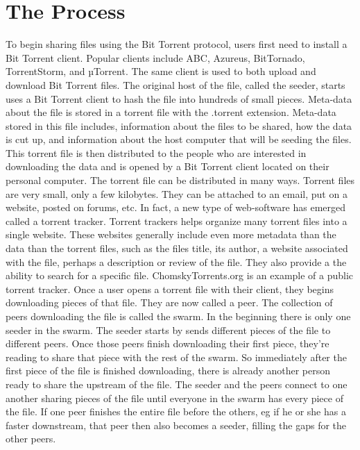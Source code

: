 \documentclass[a4paper,12pt]{report}
\begin{document}
\section{The Process}
To begin sharing files using the Bit Torrent protocol, users first need to install a Bit Torrent client. Popular clients include ABC, Azureus, BitTornado, TorrentStorm, and µTorrent. The same client is used to both upload and download Bit Torrent files.
The original host of the file, called the seeder, starts uses a Bit Torrent client to hash the file into hundreds of small pieces. Meta-data about the file is stored in a torrent file with the .torrent extension. Meta-data stored in this file includes, information about the files to be shared, how the data is cut up, and information about the host computer that will be seeding the files. This torrent file is then distributed to the people who are interested in downloading the data and is opened by a Bit Torrent client located on their personal computer. 
The torrent file can be distributed in many ways. Torrent files are very small, only a few kilobytes. They can be attached to an email, put on a website, posted on forums, etc. In fact, a new type of web-software has emerged called a torrent tracker. Torrent trackers helps organize many torrent files into a single website. These websites generally include even more metadata than the data than the torrent files, such as the files title, its author, a website associated with the file, perhaps a description or review of the file. They also provide a the ability to search for a specific file. ChomskyTorrents.org is an example of a public torrent tracker.
Once a user opens a torrent file with their client, they begins downloading pieces of that file. They are now called a peer. The collection of peers downloading the file is called the swarm. In the beginning there is only one seeder in the swarm. The seeder starts by sends different pieces of the file to different peers. Once those peers finish downloading their first piece, they’re reading to share that piece with the rest of the swarm. So immediately after the first piece of the file is finished downloading, there is already another person ready to share the upstream of the file. The seeder and the peers connect to one another sharing pieces of the file until everyone in the swarm has every piece of the file. If one peer finishes the entire file before the others, eg if he or she has a faster downstream, that peer then also becomes a seeder, filling the gaps for the other peers.
\end{document}
